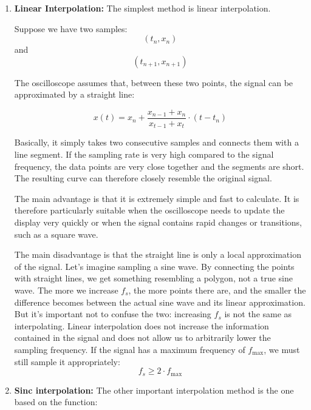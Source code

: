 \documentclass[../main.tex]{subfiles}
\begin{document}
\begin{enumerate}[label=\textbf{-}]
	\item \textbf{Linear Interpolation:} The simplest method is linear interpolation.
	
	Suppose we have two samples:
	\begin{equation}
		(t_n, x_n)
	\end{equation}
	and
	\begin{equation}
		(t_{n+1}, x_{n+1})
	\end{equation}
	
	The oscilloscope assumes that, between these two points, the signal can be approximated by a straight line:
	
	\begin{equation}
		x(t) = x_n + \frac{x_{n-1} + x_{n}}{x_{t-1} + x_{t}} \cdot (t - t_n)
	\end{equation}
	
	Basically, it simply takes two consecutive samples and connects them with a line segment. If the sampling rate is very high compared to the signal frequency, the data points are very close together and the segments are short. The resulting curve can therefore closely resemble the original signal.
 
	The main advantage is that it is extremely simple and fast to calculate.
	It is therefore particularly suitable when the oscilloscope needs to update the display very quickly or when the signal contains rapid changes or transitions, such as a square wave.

	The main disadvantage is that the straight line is only a local approximation of the signal.
	Let’s imagine sampling a sine wave. By connecting the points with straight lines, we get something resembling a polygon, not a true sine wave.
	The more we increase $f_s$, the more points there are, and the smaller the difference becomes between the actual sine wave and its linear approximation.
	But it’s important not to confuse the two: increasing $f_s$ is not the same as interpolating.
	Linear interpolation does not increase the information contained in the signal and does not allow us to arbitrarily lower the sampling frequency. If the signal has a maximum frequency of $f_\mathrm{max}$, we must still sample it appropriately:
	\begin{equation}
		f_s \geq 2 \cdot f_\mathrm{max}
	\end{equation}
	
	\item \textbf{Sinc interpolation:} The other important interpolation method is the one based on the function:
	

\end{enumerate}
\end{document}
